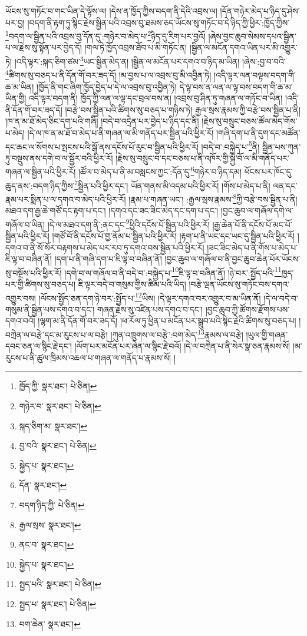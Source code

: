 ཡོངས་སུ་གཏོང་བ་གང་ཡིན་དེ་ལྟོས་ལ། །དེས་ན་ཁྱོད་ཀྱིས་བདག་ནི་དེའི་འབྲས་ལ། །དོན་གཉེར་མེད་པ་ཉིད་དུ་ཤེས་པར་བྱ། །བདག་ནི་རྟག་ཏུ་སྙིང་རྗེས་སྦྱིན་པའི་འབྲས་བུ་ཐམས་ཅད་ཡོངས་སུ་གཏོང་བ་དེ་ཉིད་ཀྱི་ཕྱིར་:ཁྱོད་ཀྱིས་\footnote{ཁྱོད་ཀྱི་  སྣར་ཐང་།  པེ་ཅིན། }བདག་ལ་སྦྱིན་པའི་འབྲས་བུ་དོན་དུ་:གཉེར་བ་མེད་པ་\footnote{གཉེར་བ་  སྣར་ཐང་།  པེ་ཅིན། }ཉིད་དུ་རིག་པར་བྱའོ། །ཞེས་བྱང་ཆུབ་སེམས་དཔའ་སྦྱིན་པ་ལ་རྗེས་སུ་སྟོན་པར་བྱེད་དོ། །གལ་ཏེ་ཁྱོད་འབྲས་ཐོབ་པ་མི་གཏོང་ན། །སྦྱིན་ལ་མངོན་དགའ་ཡིན་པར་མི་འགྱུར་ཏེ། །འདི་ལྟར་:སྐད་ཅིག་ཙམ་\footnote{སྐད་ཅིག་མ་  སྣར་ཐང་། }ཡང་སྦྱིན་མེད་ན། །སྦྱིན་ལ་མངོན་པར་དགའ་བ་ཉིད་མ་ཡིན། །ཞེས་:བྱ་བ་བའི་\footnote{བྱ་བའི་  སྣར་ཐང་།  པེ་ཅིན། }ཚིགས་སུ་བཅད་པ་ནི་དོན་གོ་བར་ཟད་དོ། །མ་བྱས་པ་ལ་འབྲས་བུ་མི་འབྱིན་ཏེ། །འདི་ལྟར་ལན་བལྟས་བདག་གི་ཆ་མ་ཡིན། །ཁྱོད་ནི་གང་ཞིག་ཁྱོད་བྱེད་པ་དེ་ལ་འབྲས་བུ་འབྱིན་ཏེ། དེ་ལྟ་བས་ན་ལན་ལ་ལྟ་བས་བདག་གི་ཆ་མ་ཡིན་གྱི། འདི་ལྟར་བདག་ནི། ཁྱོད་ཀྱི་ལན་ལ་ལྟ་དང་བྲལ་བས་ན། །འབྲས་བུ་ཤིན་ཏུ་གཞན་ལ་གཏོང་བ་ཡིན། །འདི་ནི་དོན་གོ་བར་ཟད་དོ། །བརྩེ་བས་སྦྱིན་པའི་ཚིགས་སུ་བཅད་པ་གཉིས་ཏེ། རྒྱལ་སྲས་རྣམས་ཀྱི་བརྩེ་བས་སྦྱིན་པ་ནི། །ཁ་ན་མ་ཐོ་མེད་ཅིང་དག་པའི་གཞི། །བདེ་བ་འདྲེན་པར་བྱེད་པ་ཉིད་དང་ནི། །རྗེས་སུ་བསྲུང་བཅས་ཚོལ་མེད་གོས་པ་མེད། །དེ་ལ་ཁ་ན་མ་ཐོ་བ་མེད་པ་ནི་གཞན་ལ་མི་གནོད་པར་སྦྱིན་པའི་ཕྱིར་རོ། །གཞི་དག་པ་ནི་དུག་དང་མཚོན་དང་ཆང་ལ་སོགས་པ་སྤངས་པའི་སྒོ་ནས་དངོས་པོ་རུང་བ་སྦྱིན་པའི་ཕྱིར་རོ། །བདེ་བ་:བསྐྱེད་པ་\footnote{སྐྱེད་པ་  སྣར་ཐང་། }ནི། སྦྱིན་པས་ཀུན་ཏུ་བསྡུས་ནས་དགེ་བ་ལ་སྦྱོར་བའི་ཕྱིར་རོ། །རྗེས་སུ་བསྲུང་བ་དང་བཅས་པ་ནི་འཁོར་གྱི་སྐྱེ་བོ་ལ་མི་གནོད་པར་གཞན་ལ་སྦྱིན་པའི་ཕྱིར་རོ། །ཚོལ་བ་མེད་པ་ནི་མ་བསླངས་ཀྱང་:དོན་དུ་\footnote{དོན་  སྣར་ཐང་། }གཉེར་བ་ཉིད་དམ། ཕོངས་པར་ཁོང་དུ་ཆུད་ནས་:བདག་ཉིད་ཀྱིས་\footnote{བདག་ཉིད་ཀྱི་  པེ་ཅིན། }སྦྱིན་པའི་ཕྱིར་དང་། ཡོན་གནས་མི་འདམ་པའི་ཕྱིར་རོ། །གོས་པ་མེད་པ་ནི། ལན་དང་རྣམ་པར་སྨིན་པ་ལ་དགའ་བ་མེད་པའི་ཕྱིར་རོ། །རྣམ་པ་གཞན་ཡང་། :རྒྱལ་སྲས་རྣམས་\footnote{རྒྱལ་སྲས་  སྣར་ཐང་། }ཀྱི་བརྩེ་བས་སྦྱིན་པ་ནི། མཐའ་དག་རྒྱ་ཆེ་གཙོ་དང་རྟག་པ་དང་། །དགའ་དང་ཟང་ཟིང་མེད་དང་དག་པ་དང་། །བྱང་ཆུབ་ལ་གཞོལ་དགེ་ལ་གཞོལ་བ་ཡིན། །དེ་ལ་མཐའ་དག་ནི་:ནང་དང་\footnote{ནང་བ་  སྣར་ཐང་། }ཕྱིའི་དངོས་པོ་སྦྱིན་པའི་ཕྱིར་རོ། །རྒྱ་ཆེན་པོ་ནི་དངོས་པོ་མང་པོ་སྦྱིན་པའི་ཕྱིར་རོ། །གཙོ་བོ་ནི་དངོས་པོ་གྱ་ནོམ་པ་སྦྱིན་པའི་ཕྱིར་རོ། །རྟག་པ་ནི་ཡང་དང་ཡང་དུ་སྦྱིན་པའི་ཕྱིར་རོ། །དགའ་བ་ནི་སོ་སོར་བརྟགས་པ་མེད་པར་རབ་ཏུ་དགའ་བས་སྦྱིན་པའི་ཕྱིར་རོ། །ཟང་ཟིང་མེད་པ་ནི་གོས་པ་མེད་པ་ཇི་ལྟ་བ་བཞིན་ནོ། །དག་པ་ནི་གཞི་དག་པ་ཇི་ལྟ་བ་བཞིན་ནོ། །བྱང་ཆུབ་ལ་གཞོལ་བ་ནི་བྱང་ཆུབ་ཆེན་པོར་ཡོངས་སུ་བསྔོས་པའི་ཕྱིར་རོ། །དགེ་བ་ལ་གཞོལ་བ་ནི་བདེ་བ་:བསྐྱེད་པ་\footnote{སྐྱེད་པ་  སྣར་ཐང་། }ཇི་ལྟ་བ་བཞིན་ནོ། །ཉེ་བར་:སྤྱོད་པའི་\footnote{སྤྱད་པའི་  སྣར་ཐང་།  པེ་ཅིན། }ཁྱད་པར་གྱི་ཚིགས་སུ་བཅད་པ། ཇི་ལྟར་བདེ་བ་གསུམ་གྱིས་ཚིམ་པའི་ཡིད། །བརྩེ་ལྡན་ཡོངས་སུ་གཏོང་བས་དགའ་འགྱུར་བས། །ལོངས་སྤྱོད་ཅན་དག་ཉེ་བར་:སྤྱོད་པ་\footnote{སྤྱད་པ་  སྣར་ཐང་།  པེ་ཅིན། }ཡིས། །དེ་ལྟར་དགའ་བར་འགྱུར་བ་མ་ཡིན་ནོ། །དེ་ལ་བདེ་བ་གསུམ་ནི་སྦྱིན་པས་དགའ་བ་དང་། གཞན་རྗེས་སུ་འཛིན་པས་དགའ་བ་དང་། །བྱང་ཆུབ་ཀྱི་ཚོགས་རྫོགས་པས་དགའ་བའོ། །ལྷག་མ་ནི་དོན་གོ་བར་ཟད་དོ། །ཕ་རོལ་ཏུ་ཕྱིན་པ་མངོན་པར་སྒྲུབ་པའི་སྙིང་རྗེའི་ཚིགས་སུ་བཅད་པ། །བཀྲེན་ལ་བརྩེ་དང་མ་རུངས་པ་ལ་བརྩེ། །ཀུན་འཁྲུགས་ལ་བརྩེ་:བག་མེད་\footnote{བག་ཆེན་  སྣར་ཐང་། }རྣམས་ལ་བརྩེ། །ཡུལ་གྱི་གཞན་དབང་ཅན་ལ་སྙིང་རྗེ་དང་། །ལོག་པར་མངོན་པར་ཞེན་ལ་སྙིང་རྗེ་བའོ། །དེ་ལ་བཀྲེན་པ་ནི་སེར་སྣ་ཅན་རྣམས་སོ། །མ་རུངས་པ་ནི་ཚུལ་ཁྲིམས་འཆལ་པ་གཞན་ལ་གནོད་པ་རྣམས་སོ། །
